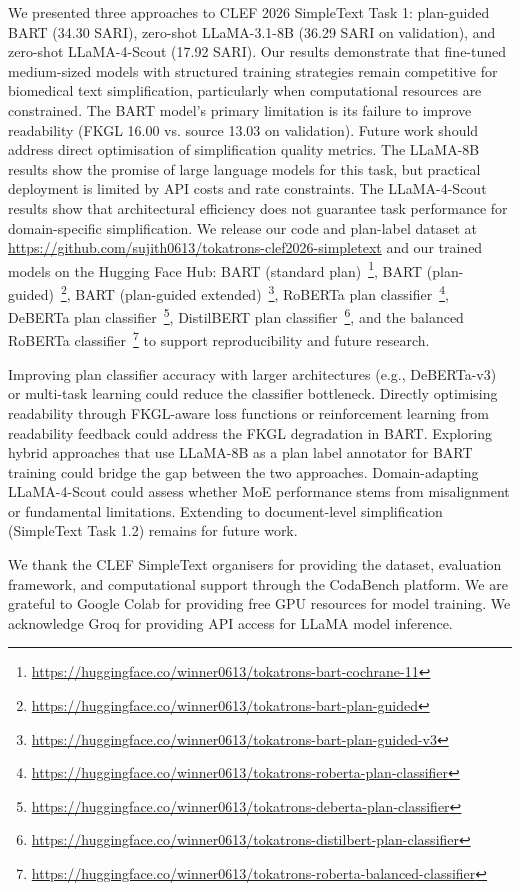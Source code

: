 \documentclass{ceurart}
\begin{document}
We presented three approaches to CLEF 2026 SimpleText Task 1: plan-guided BART (34.30 SARI), zero-shot LLaMA-3.1-8B (36.29 SARI on validation), and zero-shot LLaMA-4-Scout (17.92 SARI).
Our results demonstrate that fine-tuned medium-sized models with structured training strategies remain competitive for biomedical text simplification, particularly when computational resources are constrained.
The BART model's primary limitation is its failure to improve readability (FKGL 16.00 vs. source 13.03 on validation). Future work should address direct optimisation of simplification quality metrics.
The LLaMA-8B results show the promise of large language models for this task, but practical deployment is limited by API costs and rate constraints.
The LLaMA-4-Scout results show that architectural efficiency does not guarantee task performance for domain-specific simplification.
We release our code and plan-label dataset at \url{https://github.com/sujith0613/tokatrons-clef2026-simpletext} and our trained models on the Hugging Face Hub: BART (standard plan)~\footnote{\url{https://huggingface.co/winner0613/tokatrons-bart-cochrane-11}}, BART (plan-guided)~\footnote{\url{https://huggingface.co/winner0613/tokatrons-bart-plan-guided}}, BART (plan-guided extended)~\footnote{\url{https://huggingface.co/winner0613/tokatrons-bart-plan-guided-v3}}, RoBERTa plan classifier~\footnote{\url{https://huggingface.co/winner0613/tokatrons-roberta-plan-classifier}}, DeBERTa plan classifier~\footnote{\url{https://huggingface.co/winner0613/tokatrons-deberta-plan-classifier}}, DistilBERT plan classifier~\footnote{\url{https://huggingface.co/winner0613/tokatrons-distilbert-plan-classifier}}, and the balanced RoBERTa classifier~\footnote{\url{https://huggingface.co/winner0613/tokatrons-roberta-balanced-classifier}} to support reproducibility and future research.

Improving plan classifier accuracy with larger architectures (e.g., DeBERTa-v3) or multi-task learning could reduce the classifier bottleneck. Directly optimising readability through FKGL-aware loss functions or reinforcement learning from readability feedback could address the FKGL degradation in BART. Exploring hybrid approaches that use LLaMA-8B as a plan label annotator for BART training could bridge the gap between the two approaches. Domain-adapting LLaMA-4-Scout could assess whether MoE performance stems from misalignment or fundamental limitations. Extending to document-level simplification (SimpleText Task 1.2) remains for future work.

\begin{acknowledgments}
We thank the CLEF SimpleText organisers for providing the dataset, evaluation framework, and computational support through the CodaBench platform.
We are grateful to Google Colab for providing free GPU resources for model training.
We acknowledge Groq for providing API access for LLaMA model inference.
\end{acknowledgments}
\end{document}
